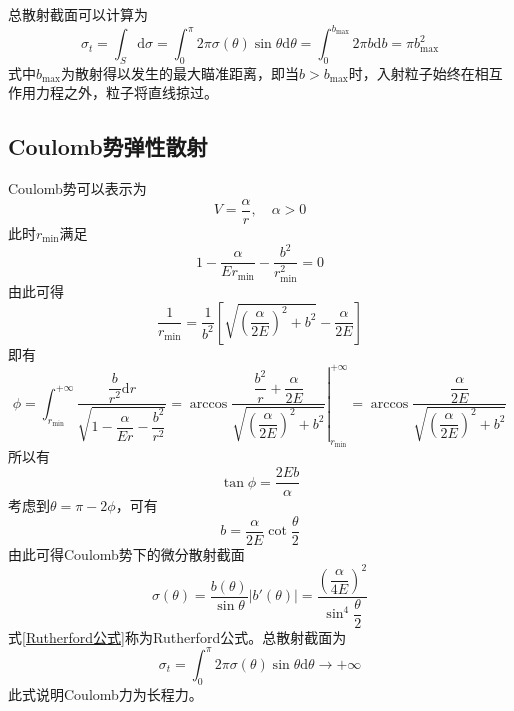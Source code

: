 {\heiti 总散射截面}可以计算为
\begin{equation}
	\sigma_t = \int_S \mathrm{d} \sigma = \int_0^\pi 2\pi \sigma(\theta) \sin \theta \mathrm{d} \theta = \int_0^{b_{\mathrm{max}}} 2\pi b\mathrm{d} b = \pi b_{\mathrm{max}}^2
\end{equation}
式中$b_{\mathrm{max}}$为散射得以发生的最大瞄准距离，即当$b>b_{\mathrm{max}}$时，入射粒子始终在相互作用力程之外，粒子将直线掠过。

\subsection{Coulomb势弹性散射}

Coulomb势可以表示为
\begin{equation*}
	V = \frac{\alpha}{r},\quad \alpha > 0
\end{equation*}
此时$r_{\mathrm{min}}$满足
\begin{equation*}
	1-  \frac{\alpha}{E r_{\mathrm{min}}} - \frac{b^2}{r_{\mathrm{min}}^2} = 0
\end{equation*}
由此可得
\begin{equation}
	\frac{1}{r_{\mathrm{min}}} = \frac{1}{b^2} \left[\sqrt{\left(\frac{\alpha}{2E}\right)^2+b^2} - \frac{\alpha}{2E}\right]
\end{equation}
即有
\begin{equation*}
	\phi = \int_{r_{\mathrm{min}}}^{+\infty} \frac{\dfrac{b}{r^2} \mathrm{d} r}{\sqrt{1-\dfrac{\alpha}{Er} - \dfrac{b^2}{r^2}}} = \left.\arccos \frac{\dfrac{b^2}{r}+\dfrac{\alpha}{2E}}{\sqrt{\left(\dfrac{\alpha}{2E}\right)^2+ b^2}}\right|_{r_{\mathrm{min}}}^{+\infty} = \arccos \frac{\dfrac{\alpha}{2E}}{\sqrt{\left(\dfrac{\alpha}{2E}\right)^2+b^2}}
\end{equation*}
所以有
\begin{equation*}
	\tan \phi = \frac{2Eb}{\alpha}
\end{equation*}
考虑到$\theta = \pi-2\phi$，可有
\begin{equation}
	b = \frac{\alpha}{2E}\cot \frac{\theta}{2}
\end{equation}
由此可得Coulomb势下的微分散射截面
\begin{equation}
	\sigma(\theta) = \frac{b(\theta)}{\sin \theta} |b'(\theta)| = \frac{\left(\dfrac{\alpha}{4E}\right)^2}{\sin^4 \dfrac{\theta}{2}}
	\label{Rutherford公式}
\end{equation}
式\eqref{Rutherford公式}称为{\heiti Rutherford公式}。总散射截面为
\begin{equation*}
	\sigma_t = \int_0^\pi 2\pi \sigma(\theta) \sin \theta \mathrm{d} \theta \to +\infty
\end{equation*}
此式说明Coulomb力为长程力。

